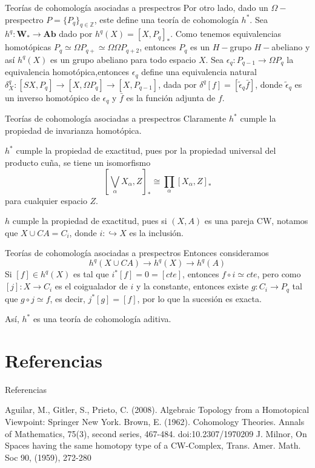 \documentclass{beamer}
\newcommand{\Z}{\mathbb{Z}}
\begin{document}
\begin{frame}{Teorías de cohomología asociadas a prespectros}
	Por otro lado, dado un $\Omega-$prespectro $P=\{P_q\}_{q\in \Z}$, este define una teoría de cohomología $h^\ast$. Sea $h^q\colon\mathbf{W}_\ast	\to \mathbf{Ab}$ dado por $h^q(X)=[X,P_q]_\ast$. Como tenemos equivalencias homotópicas $P_q \simeq \Omega P_{q+}\simeq \Omega\Omega P_{q+2}$, entonces $P_q$ es un $H-$grupo $H-$abeliano y así $h^q(X)$ es un grupo abeliano para todo espacio $X$. Sea $\epsilon_{q} \colon P_{q-1} \to \Omega P_q$ la equivalencia homotópica,entonces $\epsilon_{q}$ define una equivalencia natural $\delta^q _X\colon [SX, P_q]\to [X,\Omega P_q]\to[X,P_{q-1}]$, dada por $\delta^q[f]=[\tilde{\epsilon}_q\bar{f}]$, donde $\tilde{\epsilon}_q$ es un inverso homotópico de $\epsilon_q$ y $\bar{f}$ es la función adjunta de $f$. 
\end{frame}

\begin{frame}{Teorías de cohomología asociadas a prespectros}
	Claramente $h^\ast$ cumple la propiedad de invarianza homotópica. 
	
	$h^\ast$ cumple la propiedad de exactitud, pues por la propiedad universal del producto cuña, se tiene un isomorfismo 
	\[[\bigvee_\alpha X_\alpha,Z]_\ast\cong\prod_\alpha[X_\alpha , Z]_\ast\]
	para cualquier espacio $Z$.
	
	$h$ cumple la propiedad de exactitud, pues si $(X,A)$ es una pareja CW, notamos que $X\cup CA = C_i$, donde $i\colon \hookrightarrow X$ es la inclusión.
\end{frame}

\begin{frame}{Teorías de cohomología asociadas a prespectros}
	Entonces consideramos 
	\[h^q(X\cup CA)\to h^q (X) \to h^q(A)\]
	Si $[f]\in h^q(X)$ es tal que $i^\ast[f]=0=[cte]$, entonces $f\circ i\simeq cte$, pero como $[j]\colon X\to C_i$ es el coigualador de $i$ y la constante, entonces existe $g\colon C_i \to P_q$ tal que $g\circ j\simeq f$, es decir, $j^\ast[g]=[f]$, por lo que la sucesión es exacta.
	
	Así, $h^\ast$ es una teoría de cohomología aditiva.
\end{frame}

\section{Referencias}
\begin{frame}{Referencias}
\begin{thebibliography}{} 

 Aguilar, M., Gitler, S., Prieto, C. (2008). Algebraic Topology from a Homotopical Viewpoint: Springer New York.
 Brown, E. (1962). Cohomology Theories. Annals of Mathematics, 75(3), second series, 467-484. doi:10.2307/1970209
 J. Milnor, On Spaces having the same homotopy type of a CW-Complex, Trans. Amer. Math. Soc 90, (1959), 272-280
\end{thebibliography}
\end{frame}
\end{document}
